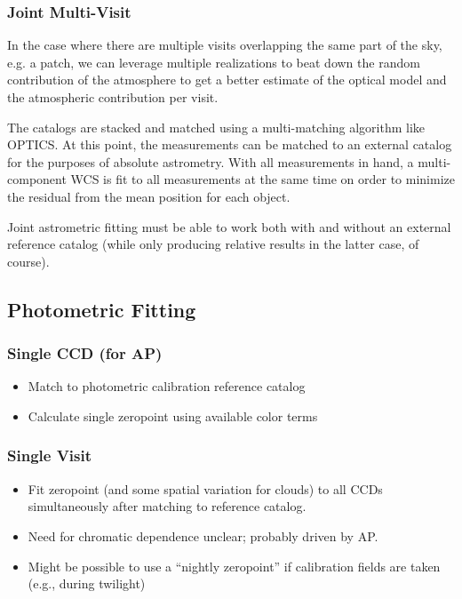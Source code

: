 \subsubsection{Joint Multi-Visit}
\label{sec:acJointAstrometricFit}
In the case where there are multiple visits overlapping the same part of the sky, e.g. a patch, we can leverage multiple realizations to beat down the random contribution of the atmosphere to get a better estimate of the optical model and the atmospheric contribution per visit.

The catalogs are stacked and matched using a multi-matching algorithm like OPTICS.  At this point, the measurements can be matched to an external catalog for the purposes of absolute astrometry.  With all measurements in hand, a multi-component WCS is fit to all measurements at the same time on order to minimize the residual from the mean position for each object.

Joint astrometric fitting must be able to work both with and without an external reference catalog (while only producing relative results in the latter case, of course).

\subsection{Photometric Fitting}
\label{sec:acPhotometricFitting}
\subsubsection{Single CCD (for AP)}
\label{sec:acSingleCCDPhotometricFit}
\begin{itemize}
\item Match to photometric calibration reference catalog
\item Calculate single zeropoint using available color terms
\end{itemize}
\subsubsection{Single Visit}
\label{sec:acSingleVisitPhotometricFit}
\begin{itemize}
\item Fit zeropoint (and some spatial variation for clouds) to all CCDs simultaneously after matching to reference catalog.
\item Need for chromatic dependence unclear; probably driven by AP.
\item Might be possible to use a ``nightly zeropoint'' if calibration fields are taken (e.g., during twilight)
\end{itemize}



